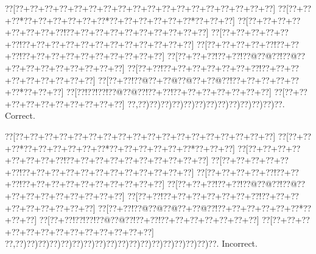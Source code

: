 \documentclass[a5paper]{article}
\begin{document}
\begin{center}
{\goo
\0??[\0??+\0??+\0??+\0??+\0??+\0??+\0??+\0??+\0??+\0??+\0??+\0??+\0??+\0??+\0??+\0??+\0??+\0??]
\0??[\0??+\0??+\0??*\0??+\0??+\0??+\0??+\0??+\0??*\0??+\0??+\0??+\0??+\0??+\0??*\0??+\0??+\0??]
\0??[\0??+\0??+\0??+\0??+\0??+\0??+\0??+\0??!\0??+\0??+\0??+\0??+\0??+\0??+\0??+\0??+\0??+\0??]
\0??[\0??+\0??+\0??+\0??+\0??+\0??!\0??+\0??+\0??+\0??+\0??+\0??+\0??+\0??+\0??+\0??+\0??+\0??]
\0??[\0??+\0??+\0??+\0??+\0??!\0??+\0??+\0??!\0??+\0??+\0??+\0??+\0??+\0??+\0??+\0??+\0??+\0??]
\0??[\0??+\0??+\0??!\0??+\0??!\0??@\0??@\0??!\0??@\0??+\0??+\0??+\0??+\0??+\0??+\0??+\0??+\0??]
\0??[\0??+\0??!\0??+\0??+\0??+\0??+\0??+\0??+\0??!\0??+\0??+\0??+\0??+\0??+\0??+\0??+\0??+\0??]
\0??[\0??+\0??!\0??@\0??+\0??@\0??@\0??+\0??@\0??!\0??+\0??+\0??+\0??+\0??+\0??*\0??+\0??+\0??]
\0??[\0??!\0??!\0??!\0??@\0??@\0??!\0??+\0??!\0??+\0??+\0??+\0??+\0??+\0??+\0??]
\0??[\0??+\0??+\0??+\0??+\0??+\0??+\0??+\0??+\0??+\0??]
\0??,\0??)\0??)\0??)\0??)\0??)\0??)\0??)\0??)\0??)\0??)\0??)\0??)\0??.
}
Correct. 

\end{center}
\begin{center}
{\goo
\0??[\0??+\0??+\0??+\0??+\0??+\0??+\0??+\0??+\0??+\0??+\0??+\0??+\0??+\0??+\0??+\0??+\0??+\0??]
\0??[\0??+\0??+\0??*\0??+\0??+\0??+\0??+\0??+\0??*\0??+\0??+\0??+\0??+\0??+\0??*\0??+\0??+\0??]
\0??[\0??+\0??+\0??+\0??+\0??+\0??+\0??+\0??!\0??+\0??+\0??+\0??+\0??+\0??+\0??+\0??+\0??+\0??]
\0??[\0??+\0??+\0??+\0??+\0??+\0??!\0??+\0??+\0??+\0??+\0??+\0??+\0??+\0??+\0??+\0??+\0??+\0??]
\0??[\0??+\0??+\0??+\0??+\0??!\0??+\0??+\0??!\0??+\0??+\0??+\0??+\0??+\0??+\0??+\0??+\0??+\0??]
\0??[\0??+\0??+\0??!\0??+\0??!\0??@\0??@\0??!\0??@\0??+\0??+\0??+\0??+\0??+\0??+\0??+\0??+\0??]
\0??[\0??+\0??!\0??+\0??+\0??+\0??+\0??+\0??+\0??!\0??+\0??+\0??+\0??+\0??+\0??+\0??+\0??+\0??]
\0??[\0??+\0??!\0??@\0??@\0??@\0??+\0??@\0??!\0??+\0??+\0??+\0??+\0??+\0??*\0??+\0??+\0??]
\0??[\0??+\0??!\0??!\0??!\0??@\0??@\0??!\0??+\0??!\0??+\0??+\0??+\0??+\0??+\0??+\0??]
\0??[\0??+\0??+\0??+\0??+\0??+\0??+\0??+\0??+\0??+\0??+\0??+\0??+\0??]
\0??,\0??)\0??)\0??)\0??)\0??)\0??)\0??)\0??)\0??)\0??)\0??)\0??)\0??)\0??)\0??)\0??)\0??)\0??.
}
Incorrect. 

\end{center}
\newpage
\end{document}
